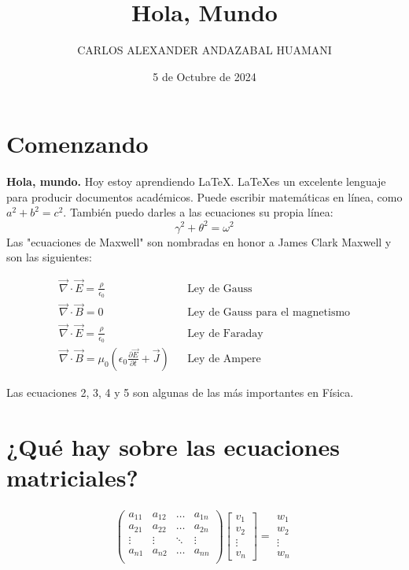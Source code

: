 \documentclass{article}
\begin{document}
\title{Hola, Mundo}
\author{CARLOS ALEXANDER ANDAZABAL HUAMANI}
\date{5 de Octubre de 2024}



\maketitle

\section{Comenzando}
\textbf{Hola, mundo.} Hoy estoy aprendiendo \LaTeX . \LaTeX es un excelente lenguaje para producir documentos académicos. Puede escribir matemáticas en línea, como $a^2+b^2=c^2$. También puedo darles a las ecuaciones su propia línea:
\begin{equation}
\gamma^2+\theta^2=\omega^2    
\end{equation}
Las "ecuaciones de Maxwell" son nombradas en honor a James Clark Maxwell y son las siguientes:
\begin{equations}
\begin{align}
\vec{\nabla}\cdot\vec{E} =\frac{\rho}{\epsilon_0}  && \text{Ley de Gauss} \\
\vec{\nabla}\cdot\vec{B} =0 && \text{Ley de Gauss para el magnetismo} \\    
\vec{\nabla}\cdot\vec{E} =\frac{\rho}{\epsilon_0} && \text{Ley de Faraday} \\
\vec{\nabla}\cdot\vec{B} =\mu_0(\epsilon_0\frac{\partial\vec{E}}{\partial t}+\vec{J}) && \text{Ley de Ampere}
\end{align}
\end{equations}
Las ecuaciones 2, 3, 4 y 5 son algunas de las más importantes en Física.
\maketitle

\section{¿Qué hay sobre las ecuaciones matriciales?}
\begin{align*}
\begin{pmatrix}
    a_{11} & a_{12} & \dots & a_{1n} \\
    a_{21} & a_{22} & \dots & a_{2n} \\
    \vdots & \vdots & \ddots & \vdots \\
    a_{n1} & a_{n2} & \dots & a_{nn} \\
\end{pmatrix}
\begin{bmatrix}
    v_1 \\
    v_2\\
    \vdots\\
    v_n
\end{bmatrix}
=
\begin{matrix}
    w_1 \\
    w_2\\
    \vdots\\
    w_n  
\end{matrix}  
\end{align*}
\end{document}
